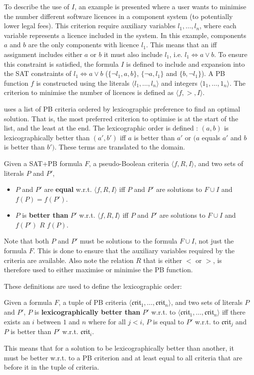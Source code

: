 To describe the use of $I$, an example is presented where a user wants to minimise the number different software licences in a component system (to potentially lower legal fees).
This criterion require  auxiliary variables $l_1,\ldots,l_n$, where each variable represents a licence included in the system.
In this example, components $a$ and $b$ are the only components with licence $l_1$.
This means that an iff assignment includes either $a$ or $b$ it must also include $l_1$, i.e. $l_1 \Leftrightarrow a \vee b$.
To ensure this constraint is satisfied, the formula $I$ is defined to include and expansion into the SAT constraints of $l_1 \Leftrightarrow a \vee b$ ($\{\neg l_1, a , b\}$, $\{\neg a , l_1\}$ 
and $\{b , \neg l_1\}$).
A PB function $f$ is constructed using the literals $\langle l_1,\ldots,l_n\rangle$ and integers $\langle 1_1,\ldots,1_n\rangle$.
The criterion to minimise the number of licences is defined as $\langle f, > , I \rangle$.

\modelimpl uses a list of PB criteria ordered by lexicographic preference to find an optimal solution.
That is, the most preferred criterion to optimise is at the start of the list, and the least at the end. 
The lexicographic order is defined : $(a,b)$  is lexicographically better than $(a',b')$ iff $a$ is better than $a'$ or $(a$ equals $a'$ and $b$ is better than $b')$.
These terms are translated to the \modelimpl domain.
\begin{defs}
Given a SAT+PB formula $F$, a pseudo-Boolean criteria $\langle f,R, I \rangle$, and two sets of literals $P$ and $P'$, 
\begin{itemize}
  \item $P$ and $P'$ are \textbf{equal} w.r.t. $\langle f,R, I \rangle$ iff $P$ and $P'$ are solutions to $F \cup I$ and $f(P) = f(P')$.
  \item $P$ is \textbf{better than} $P'$ w.r.t. $\langle f,R, I \rangle$ iff $P$ and $P'$ are solutions to $F \cup I$ and $f(P')$ $R$ $f(P)$.
\end{itemize}
\end{defs}
Note that both $P$ and $P'$ must be solutions to the formula $F \cup I$, not just the formula $F$.
This is done to ensure that the auxiliary variables required by the criteria are available.
Also note the relation $R$ that is either $<$ or $>$, is therefore used to either maximise or minimise the PB function.

These definitions are used to define the lexicographic order:
\begin{defs}
Given a formula $F$, a tuple of PB criteria $\langle \mathfrak{crit}_1,\ldots,\mathfrak{crit}_n \rangle$, and two sets of literals $P$ and $P'$,
$P$ is \textbf{lexicographically better than}  $P'$ w.r.t. to $\langle \mathfrak{crit}_1,\ldots,\mathfrak{crit}_n \rangle$
iff there exists an $i$ between $1$ and $n$ where for all $j < i$, $P$ is equal to $P'$ w.r.t. to $\mathfrak{crit}_j$ and $P$ is better than $P'$ w.r.t. $\mathfrak{crit}_i$.
\end{defs}
This means that for a solution to be lexicographically better than another, 
it must be better w.r.t. to a PB criterion and at least equal to all criteria that are before it in the tuple of criteria. 

